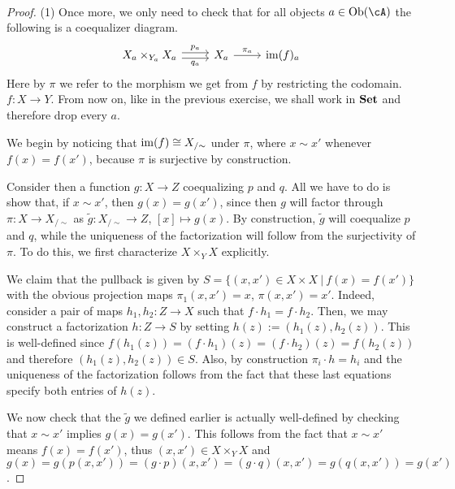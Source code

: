 \documentclass[a4paper,11pt,openany]{scrartcl}
\begin{document}
~\\
\begin{proof}
    (1) Once more, we only need to check that for all objects $a\in\Ob(\cA)$ the
    following is a coequalizer diagram.
    \[\begin{tikzcd}
	{X_a\times_{Y_a}X_a} & {X_a} & {\im(f)_a}
	\arrow["{p_a}", from=1-1, to=1-2, shift left=1]
	\arrow["{q_a}"', from=1-1, to=1-2, shift right=1]
	\arrow["{\pi_a}"', from=1-2, to=1-3, swap]
    \end{tikzcd}\]
    Here by $\pi$ we refer to the morphism we get from $f$ by restricting the
    codomain. $f\colon X\rightarrow Y$. From now on, like in the previous
    exercise, we shall work in $\operatorname{\mathbf{Set}}$ and therefore drop every $a$.

    We begin by noticing that $\operatorname{im}(f)\cong X_{/\sim}$ under $\pi$, where $x\sim x'$
    whenever $f(x)=f(x')$, because $\pi$ is surjective by construction.

    Consider then a function $g\colon X\rightarrow Z$ coequalizing $p$ and $q$.
    All we have to do is show that, if $x\sim x'$, then $g(x)=g(x')$, since then
    $g$ will factor through $\pi\colon X\rightarrow X_{/\sim}$ as
    $\tilde{g}\colon X_{/\sim}\rightarrow Z$, $[x]\mapsto g(x)$. By construction,
    $\tilde{g}$ will coequalize $p$ and $q$, while the uniqueness of the
    factorization will follow from the surjectivity of $\pi$. To do this, we
    first characterize $X\times_YX$ explicitly.

    We claim that the pullback is given by $S=\{(x,x')\in X\times X\ |\
    f(x)=f(x')\}$ with the obvious projection maps $\pi_1(x,x')=x$,
    $\pi(x,x')=x'$. Indeed, consider a pair of maps $h_1,h_2\colon Z\rightarrow
    X$ such that $f\cdot h_1=f\cdot h_2$. Then, we may construct a factorization
    $h\colon Z\rightarrow S$ by setting $h(z):=(h_1(z),h_2(z))$. This is
    well-defined since $f(h_1(z))=(f\cdot h_1)(z)=(f\cdot h_2)(z)=f(h_2(z))$ and
    therefore $(h_1(z),h_2(z))\in S$. Also, by construction $\pi_i\cdot h=h_i$
    and the uniqueness of the factorization follows from the fact that these
    last equations specify both entries of $h(z)$.

    We now check that the $\tilde{g}$ we defined earlier is actually
    well-defined by checking that $x\sim x'$ implies $g(x)=g(x')$. This follows
    from the fact that $x\sim x'$ means $f(x)=f(x')$, thus $(x,x')\in
    X\times_YX$ and $g(x)=g(p(x,x'))=(g\cdot p)(x,x')=(g\cdot
    q)(x,x')=g(q(x,x'))=g(x')$.


\end{proof}
\end{document}
